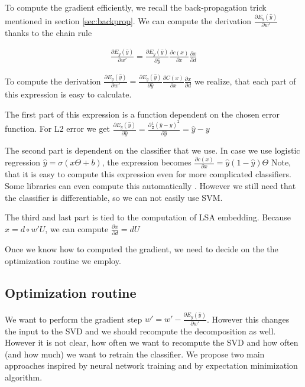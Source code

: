     To compute the gradient efficiently, we recall the back-propagation trick mentioned in section \ref{sec:backprop}.
    We can compute the derivation $\frac{\partial E_y(\hat{y})}{\partial w'}$ thanks to the chain rule
    
    \begin{align}
    \frac{\partial E_y(\hat{y})}{\partial w'} = \frac{\partial E_y(\hat{y})}{\partial \hat{y}} \frac{\partial c(x)}{\partial x} \frac{\partial x}{\partial d}
    \end{align}
    
    To compute the derivation $\frac{\partial E_y(\hat{y})}{\partial w'} = \frac{\partial E_y(\hat{y})}{\partial \hat{y}} \frac{\partial C(x)}{\partial x} \frac{\partial x}{\partial d}$ we realize,
    that each part of this expression is easy to calculate.
    
    The first part of this expression is a function dependent on the chosen error function. 
    For L2 error we get 
    $\frac{\partial E_y(\hat{y})}{\partial \hat{y}} = \frac{\partial \frac{1}{2}(\hat{y}-y)^2}{\partial \hat{y}} = \hat{y}-y$
    
    The second part is dependent on the classifier that we use. 
    In case we use logistic regression $\hat{y} = \sigma(x \Theta + b)$, the expression becomes
    $\frac{\partial c(x)}{\partial x} = \hat{y} (1-\hat{y}) \Theta$
    Note, that it is easy to compute this expression even for more complicated classifiers. 
    Some libraries can even compute this automatically \cite{tensorflow2015-whitepaper}.
    However we still need that the classifier is differentiable, so we can not easily use SVM. 
    
    The third and last part is tied to the computation of LSA embedding.
    Because $x = d \circ w' U$, we can compute 
    $\frac{\partial x}{\partial d} = d U$ \* %
    
    Once we know how to computed the gradient, we need to decide on the the optimization routine we employ.

    \subsection{Optimization routine}
    
    We want to perform the gradient step $w' = w' - \frac{\partial E_y(\hat{y})}{\partial w'}$. 
    However this changes the input to the SVD and we should recompute the decomposition as well. 
    However it is not clear, how often we want to recompute the SVD and how often (and how much) we want to retrain the classifier.
    We propose two main approaches inspired by neural network training and by 
    expectation minimization algorithm. \* %
    
